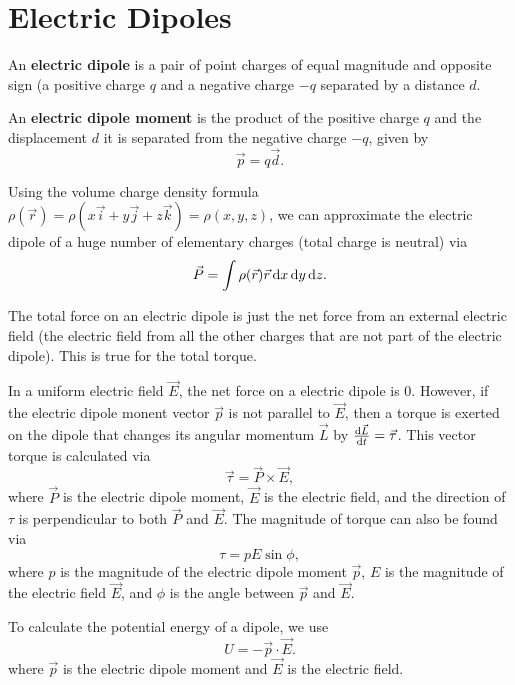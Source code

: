 \section{Electric Dipoles}
An \textbf{electric dipole} is a pair of point charges of equal magnitude and opposite sign (a positive charge $q$ and a negative charge $-q$ separated by a distance $d$.

An \textbf{electric dipole moment} is the product of the positive charge $q$ and the displacement $d$ it is separated from the negative charge $-q$, given by
\begin{equation}
\vec{p} = q\vec{d}.
\end{equation}

Using the volume charge density formula $\rho(\vec{r}) = \rho(x\vec{i} + y\vec{j} + z\vec{k}) = \rho(x, y, z)$, we can approximate the electric dipole of a huge number of elementary charges (total charge is neutral) via
\begin{equation}
\vec{P} = \int\rho(\vec{r})\vec{r}\operatorname{d\!} x \operatorname{d\!} y \operatorname{d\!} z.
\end{equation}

The total force on an electric dipole is just the net force from an external electric field (the electric field from all the other charges that are not part of the electric dipole). This is true for the total torque.

In a uniform electric field $\vec{E}$, the net force on a electric dipole is 0. However, if the electric dipole monent vector $\vec{p}$ is not parallel to $\vec{E}$, then a torque is exerted on the dipole that changes its angular momentum $\vec{L}$ by $\frac{\operatorname{d\!} \vec{L}}{\operatorname{d\!} t} = \vec{\tau}$. This vector torque is calculated via
\begin{equation}
\vec{\tau} = \vec{P} \times \vec{E},
\end{equation}
where $\vec{P}$ is the electric dipole moment, $\vec{E}$ is the electric field, and the direction of $\tau$ is perpendicular to both $\vec{P}$ and $\vec{E}$. The magnitude of torque can also be found via
\begin{equation}
    \tau = pE\sin\phi,
\end{equation}
where $p$ is the magnitude of the electric dipole moment $\vec{p}$, $E$ is the magnitude of the electric field $\vec{E}$, and $\phi$ is the angle between $\vec p$ and $\vec E$.

To calculate the potential energy of a dipole, we use
\begin{equation}
U = -\vec{p}\cdot \vec{E}.
\end{equation}
where $\vec p$ is the electric dipole moment and $\vec E$ is the electric field.

